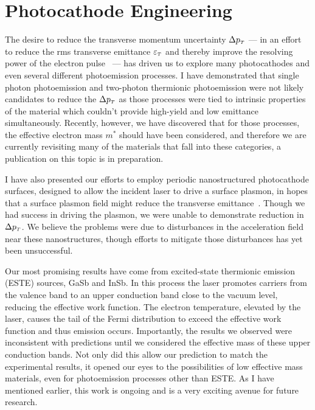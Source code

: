 \section{Photocathode Engineering}

The desire to reduce the transverse momentum uncertainty $\Delta p_{{\scriptscriptstyle T}}$ --- in an effort to reduce the rms transverse emittance $\varepsilon_{{\scriptscriptstyle T}}$ and thereby improve the resolving power of the electron pulse~\cite{berger_dc_2009} --- has driven us to explore many photocathodes and even several different photoemission processes.
I have demonstrated that single photon photoemission and two-photon thermionic photoemission were not likely candidates to reduce the $\Delta p_{{\scriptscriptstyle T}}$ as those processes were tied to intrinsic properties of the material which couldn't provide high-yield and low emittance simultaneously.
Recently, however, we have discovered that for those processes, the effective electron mass $m^*$ should have been considered, and therefore we are currently revisiting many of the materials that fall into these categories, a publication on this topic is in preparation.

I have also presented our efforts to employ periodic nanostructured photocathode surfaces, designed to allow the incident laser to drive a surface plasmon, in hopes that a surface plasmon field might reduce the transverse emittance~\cite{zawadzka_evanescent_2001,kupersztych_ponderomotive_2001,kupersztych_anomalous_2005,li_surface_2013}.
Though we had success in driving the plasmon, we were unable to demonstrate reduction in $\Delta p_{{\scriptscriptstyle T}}$.
We believe the problems were due to disturbances in the acceleration field near these nanostructures, though efforts to mitigate those disturbances has yet been unsuccessful.

Our most promising results have come from excited-state thermionic emission (ESTE) sources, GaSb and InSb.
In this process the laser promotes carriers from the valence band to an upper conduction band close to the vacuum level, reducing the effective work function.
The electron temperature, elevated by the laser, causes the tail of the Fermi distribution to exceed the effective work function and thus emission occurs.
Importantly, the results we observed were inconsistent with predictions until we considered the effective mass of these upper conduction bands.
Not only did this allow our prediction to match the experimental results, it opened our eyes to the possibilities of low effective mass materials, even for photoemission processes other than ESTE.
As I have mentioned earlier, this work is ongoing and is a very exciting avenue for future research.


